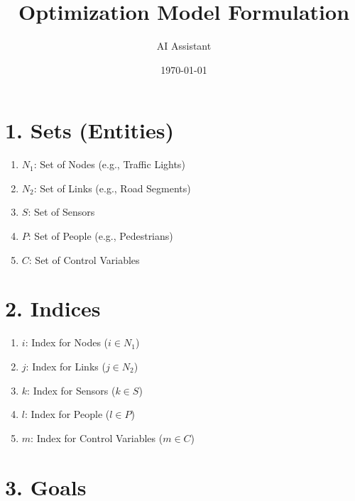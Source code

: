 \documentclass{article}
\title{Optimization Model Formulation}
\author{AI Assistant}
\date{\today}
\begin{document}
\maketitle

\tableofcontents

\section{1. Sets (Entities)}
\label{sec:sets}

\begin{enumerate}[label=\arabic*.]
    \item $N_1$: Set of Nodes (e.g., Traffic Lights)
    \item $N_2$: Set of Links (e.g., Road Segments)
    \item $S$: Set of Sensors
    \item $P$: Set of People (e.g., Pedestrians)
    \item $C$: Set of Control Variables
\end{enumerate}

\section{2. Indices}
\label{sec:indices}

\begin{enumerate}[label=\arabic*.]
    \item $i$: Index for Nodes ($i \in N_1$)
    \item $j$: Index for Links ($j \in N_2$)
    \item $k$: Index for Sensors ($k \in S$)
    \item $l$: Index for People ($l \in P$)
    \item $m$: Index for Control Variables ($m \in C$)
\end{enumerate}

\section{3. Goals}
\label{sec:goals}
\end{document}
